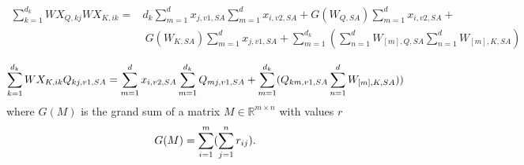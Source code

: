 \begin{equation}
\begin{aligned}
    \sum_{k=1}^{d_k} WX_{Q,kj} WX_{K,ik} = & d_k \sum_{m=1}^{d} x_{j,v1,SA} \sum_{m=1}^{d} x_{i,v2,SA} + G(W_{Q,SA}) \sum_{m=1}^{d} x_{i,v2,SA} + \\
    &\ G(W_{K,SA}) \sum_{m=1}^{d} x_{j,v1,SA} + \sum_{m=1}^{d_k} (\sum_{n=1}^{d} W_{[m],Q,SA} \sum_{n=1}^{d} W_{[m],K,SA}) \\
\end{aligned}
\label{peqn:13}
\end{equation}
\begin{equation}
    \sum_{k=1}^{d_k} WX_{K,ik} Q_{kj,v1,SA} = \sum_{m=1}^{d} x_{i,v2,SA} \sum_{m=1}^{d_k} Q_{mj,v1,SA} + \sum_{m=1}^{d_k} (Q_{km,v1,SA} \sum_{n=1}^{d} W_{[m],K,SA})) \\
\label{peqn:14}
\end{equation}
where $G(M)$ is the grand sum of a matrix $M \in \mathbb{R}^{m \times n}$ with values $r$
\begin{equation}
    G(M) = \sum_{i=1}^{m} (\sum_{j=1}^{n} r_{ij}). \\
\end{equation}

